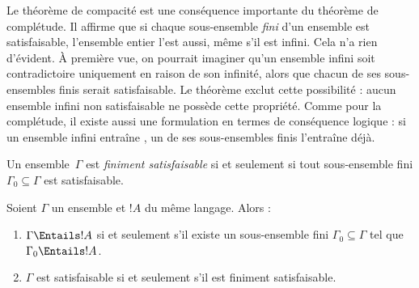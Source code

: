 \documentclass[../../../include/open-logic-section]{subfiles}
\begin{document}
      {}
      {}


Le théorème de compacité est une conséquence importante du théorème de
complétude. Il affirme que si chaque sous-ensemble \emph{fini} d'un
ensemble  est satisfaisable, l'ensemble entier l'est
aussi, même s'il est infini. Cela n'a rien d'évident. À première vue,
on pourrait imaginer qu'un ensemble infini  soit
contradictoire uniquement en raison de son infinité, alors que chacun
de ses sous-ensembles finis serait satisfaisable. Le théorème exclut
cette possibilité : aucun ensemble infini non satisfaisable  ne possède cette propriété. Comme pour la complétude,
il existe aussi une formulation en termes de conséquence logique : si
un ensemble infini  entraîne , un de ses
sous-ensembles finis l'entraîne déjà.

\begin{defn}
  Un ensemble~$\Gamma$ 
  est \emph{finiment satisfaisable} si et seulement si tout
  sous-ensemble fini $\Gamma_0\subseteq\Gamma$ est satisfaisable.
\end{defn}

\begin{thm}
Soient $\Gamma$ un ensemble  et $!A$
 du même langage. Alors :
\begin{enumerate}
  \item $\Gamma\Entails !A$ si et seulement s'il existe un
    sous-ensemble fini $\Gamma_0\subseteq\Gamma$ tel que
    $\Gamma_0\Entails !A$.
  \item $\Gamma$ est satisfaisable si et seulement s'il est finiment
    satisfaisable.
\end{enumerate}
\end{thm}
\end{document}
